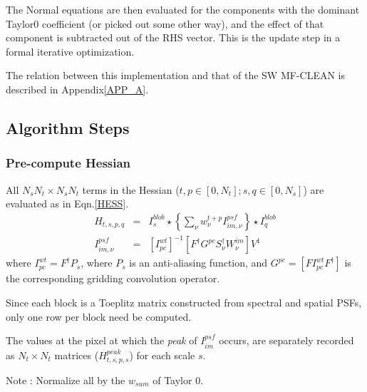 \documentclass[structabstract]{aa}
\newcommand{\F}{{F}}
\newcommand{\Fd}{{F^\dag}}
\newcommand{\G}{{G}}
\newcommand{\Snd}{{S_{\nu}^\dag}}
\newcommand{\Wimn}{{W^{im}_{\nu}}}
\newcommand{\wntp}{{w_{\nu}^{t+p}}}
\begin{document}
The Normal equations are then evaluated for the components with the dominant Taylor0
coefficient (or picked out some other way), and the effect of that component is
subtracted out of the RHS vector. This is the update step in a formal iterative
optimization.


The relation between this implementation and that of the SW MF-CLEAN is described in Appendix\ref{APP_A}.

\subsection{Algorithm Steps}
\subsubsection{Pre-compute Hessian}  
All $N_s N_t \times N_s N_t$ terms in the Hessian ($t,p \in [0,N_t]; s,q \in [0,N_s]$) are 
evaluated as in Eqn.\ref{HESS}.
\begin{eqnarray}
H_{t,s,p,q} &=& I^{blob}_s \star \left\{ \sum_{\nu} \wntp I^{psf}_{im,\nu} \right\} \star I^{blob}_q \\
 I^{psf}_{im,\nu} &=& [I^{wt}_{pc}]^{-1} [ \Fd \G^{pc} \Snd \Wimn]  V^{1}
\end{eqnarray}
where $I^{wt}_{pc} = \Fd P_s$, where $P_s$ is an anti-aliasing function,
and $\G^{pc} = [\F I^{wt}_{pc}\Fd]$ is the corresponding gridding convolution operator.

Since each block is a Toeplitz matrix constructed from spectral and spatial PSFs, only one
row per block need be computed.

The values at the pixel at which the
{\it peak} of $I^{psf}_{im}$ occurs,
are separately recorded as $N_t\times N_t$ matrices ($H^{peak}_{t,s,p,s}$) for each scale $s$.

Note : Normalize all by the $w_{sum}$ of Taylor 0.
\end{document}

